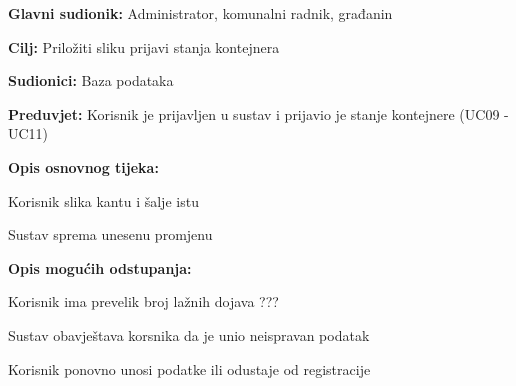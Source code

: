 				\noindent {}
					\begin{packed_item}
	
						\item \textbf{Glavni sudionik: }Administrator, komunalni radnik, građanin
						\item  \textbf{Cilj:} Priložiti sliku prijavi stanja kontejnera
						\item  \textbf{Sudionici:} Baza podataka
						\item  \textbf{Preduvjet:} Korisnik je prijavljen u sustav i prijavio je stanje kontejnere (UC09 - UC11)
						\item  \textbf{Opis osnovnog tijeka:}
						
						\item[] \begin{packed_enum}
	
							\item Korisnik slika kantu i šalje istu
							\item Sustav sprema unesenu promjenu
						\end{packed_enum}
						
						\item  \textbf{Opis mogućih odstupanja:}
						
						\item[] \begin{packed_item}
	
							\item[2.a] Korisnik ima prevelik broj lažnih dojava ???
							
							\item[] \begin{packed_enum}
								
								\item Sustav obavještava korsnika da je unio neispravan podatak
								\item Korisnik ponovno unosi podatke ili odustaje od registracije
								
							
							\end{packed_enum}
							
						\end{packed_item}
					\end{packed_item}


				
				
